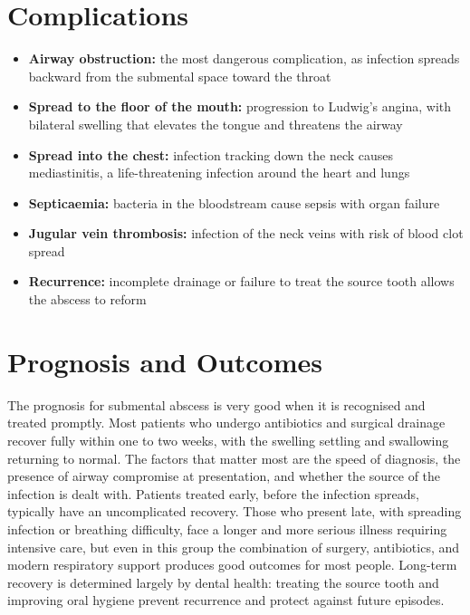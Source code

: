 \section*{Complications}
\begin{itemize}
    \item \textbf{Airway obstruction:} the most dangerous complication, as infection spreads backward from the submental space toward the throat
    \item \textbf{Spread to the floor of the mouth:} progression to Ludwig's angina, with bilateral swelling that elevates the tongue and threatens the airway
    \item \textbf{Spread into the chest:} infection tracking down the neck causes mediastinitis, a life-threatening infection around the heart and lungs
    \item \textbf{Septicaemia:} bacteria in the bloodstream cause sepsis with organ failure
    \item \textbf{Jugular vein thrombosis:} infection of the neck veins with risk of blood clot spread
    \item \textbf{Recurrence:} incomplete drainage or failure to treat the source tooth allows the abscess to reform
\end{itemize}

\section*{Prognosis and Outcomes}
The prognosis for submental abscess is very good when it is recognised and treated promptly. Most patients who undergo antibiotics and surgical drainage recover fully within one to two weeks, with the swelling settling and swallowing returning to normal. The factors that matter most are the speed of diagnosis, the presence of airway compromise at presentation, and whether the source of the infection is dealt with. Patients treated early, before the infection spreads, typically have an uncomplicated recovery. Those who present late, with spreading infection or breathing difficulty, face a longer and more serious illness requiring intensive care, but even in this group the combination of surgery, antibiotics, and modern respiratory support produces good outcomes for most people. Long-term recovery is determined largely by dental health: treating the source tooth and improving oral hygiene prevent recurrence and protect against future episodes.

